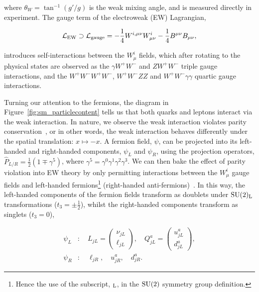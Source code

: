 \noindent
where $\theta_W=\tan^{-1}(g'/g)$ is the weak mixing angle, and is measured directly in experiment. The gauge term of the electroweak (EW) Lagrangian,

\begin{equation}
    \mathcal{L}_{\rm{EW}} \supset \mathcal{L}_{\rm{gauge}} = -\frac{1}{4}W^{i,\mu\nu}W^i_{\mu\nu} - \frac{1}{4}B^{\mu\nu}B_{\mu\nu},
\end{equation}

\noindent
introduces self-interactions between the $W^i_\mu$ fields, which after rotating to the physical states are observed as the $\gamma W^+W^-$ and $Z W^+W^-$ triple gauge interactions, and the $W^+W^-W^+W^-$, $W^+W^-ZZ$ and $W^+W^-\gamma\gamma$ quartic gauge interactions.

Turning our attention to the fermions, the diagram in Figure~\ref{fig:sm_particlecontent} tells us that both quarks and leptons interact via the weak interaction. In nature, we observe the weak interaction violates parity conservation~\cite{PhysRev.105.1413}, or in other words, the weak interaction behaves differently under the spatial translation: $x\mapsto-x$. A fermion field, $\psi$, can be projected into its left-handed and right-handed components, $\psi_L$ and $\psi_R$, using the projection operators, $\hat{P}_{L/R} = \frac{1}{2}(1\mp\gamma^5)$, where $\gamma^5=\gamma^0\gamma^1\gamma^2\gamma^3$. We can then bake the effect of parity violation into EW theory by only permitting interactions between the $W^i_\mu$ gauge fields and left-handed fermions\footnote{Hence the use of the subscript, ${}_{\rm{L}}$, in the ${\rm{SU}}(2)$ symmetry group definition.} (right-handed anti-fermions)~\cite{Aitchison:2004cs}. In this way, the left-handed components of the fermion fields transform as doublets under ${\rm{SU}}(2)_{\rm{L}}$ transformations ($t_3=\pm\frac{1}{2}$), whilst the right-handed components transform as singlets ($t_3=0$),

\begin{equation}
\begin{split}
    \psi_L&: \quad L_{jL} = \begin{pmatrix}
    \nu_{jL} \\
    \ell_{jL}
    \end{pmatrix}, \quad Q^a_{jL} = \begin{pmatrix}
    u^a_{jL} \\
    d^a_{jL}
    \end{pmatrix},
    \\
    \psi_R&: \quad \ell_{jR}, \quad u^a_{jR}, \quad d^a_{jR}.
\end{split}
\end{equation}

